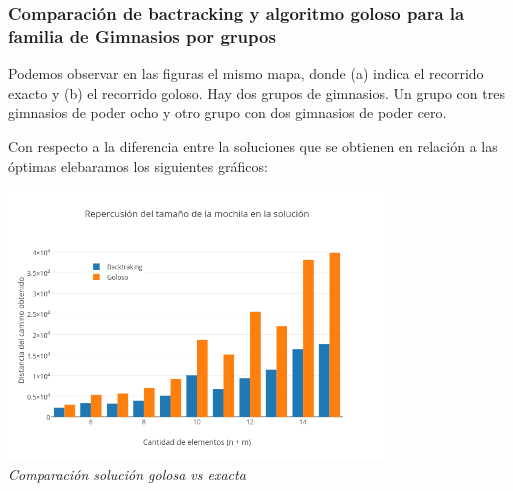 \subsubsection*{Comparación de bactracking y algoritmo goloso para la familia de Gimnasios por grupos} 

Podemos observar en las figuras el mismo mapa, donde (a) indica el recorrido exacto y (b) el recorrido goloso. Hay dos grupos de gimnasios. Un grupo con tres gimnasios de poder ocho y otro grupo con dos gimnasios de poder cero.

   \begin{figure}[h]
 \centering
       \label{fig:randomexacto}
    \label{fig:randomgoloso}
    \end{figure}
   
Con respecto a la diferencia entre la soluciones que se obtienen en relaci\'on a las \'optimas elebaramos los siguientes gráficos:\\
 
\vspace*{0.3cm} \vspace*{0.3cm}
  \begin{center}
 \includegraphics[width=0.75\textwidth]{./EJ2/familia.png}
\\{\textit{Comparación solución golosa vs exacta}}
  \end{center}

